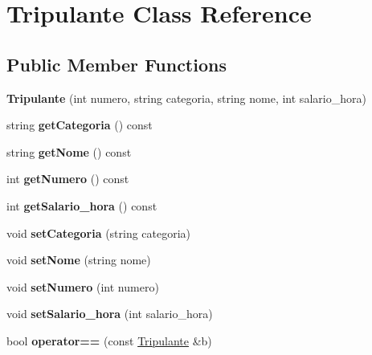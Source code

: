 \hypertarget{class_tripulante}{
\section{Tripulante Class Reference}
\label{class_tripulante}
}
\subsection*{Public Member Functions}
\begin{DoxyCompactItemize}
\item 
\hypertarget{class_tripulante_a83879ca987af9388f5d854d77d4e9ce7}{
{\bfseries Tripulante} (int numero, string categoria, string nome, int salario\_\-hora)}
\label{class_tripulante_a83879ca987af9388f5d854d77d4e9ce7}

\item 
\hypertarget{class_tripulante_a44030a837e2e1297adfcca6d1bc9edca}{
string {\bfseries getCategoria} () const }
\label{class_tripulante_a44030a837e2e1297adfcca6d1bc9edca}

\item 
\hypertarget{class_tripulante_a6382a1efb955c2df98a9d727e409539c}{
string {\bfseries getNome} () const }
\label{class_tripulante_a6382a1efb955c2df98a9d727e409539c}

\item 
\hypertarget{class_tripulante_accc87dfc21b8fa0b5365e23cad5b6d11}{
int {\bfseries getNumero} () const }
\label{class_tripulante_accc87dfc21b8fa0b5365e23cad5b6d11}

\item 
\hypertarget{class_tripulante_a21d00af5eae9a2a5adcbdeaac598d017}{
int {\bfseries getSalario\_\-hora} () const }
\label{class_tripulante_a21d00af5eae9a2a5adcbdeaac598d017}

\item 
\hypertarget{class_tripulante_a369d9f8de001b8c7bd711e78165c6c22}{
void {\bfseries setCategoria} (string categoria)}
\label{class_tripulante_a369d9f8de001b8c7bd711e78165c6c22}

\item 
\hypertarget{class_tripulante_a090991ae1e0cac296808f9e1a2ad8a56}{
void {\bfseries setNome} (string nome)}
\label{class_tripulante_a090991ae1e0cac296808f9e1a2ad8a56}

\item 
\hypertarget{class_tripulante_a30c783c419632894ddc51bd3d4f88f7d}{
void {\bfseries setNumero} (int numero)}
\label{class_tripulante_a30c783c419632894ddc51bd3d4f88f7d}

\item 
\hypertarget{class_tripulante_a12ac9122d2257db23d8382276d0143f9}{
void {\bfseries setSalario\_\-hora} (int salario\_\-hora)}
\label{class_tripulante_a12ac9122d2257db23d8382276d0143f9}

\item 
\hypertarget{class_tripulante_a5f9256aea5ce4a555d546b9c6042fe96}{
bool {\bfseries operator==} (const \hyperlink{class_tripulante}{Tripulante} \&b)}
\label{class_tripulante_a5f9256aea5ce4a555d546b9c6042fe96}

\end{DoxyCompactItemize}

